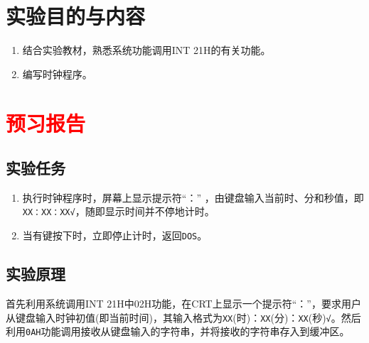 \documentclass[11pt]{SEU-Digital-Report}
\begin{document}
\exptitlepage

\tableofcontents
\newpage

\section{实验目的与内容}       
\begin{enumerate}
    \item 结合实验教材\cite{book,guide}，熟悉系统功能调用INT 21H的有关功能。
    \item 编写时钟程序。
\end{enumerate}

\section{\textcolor{red}{预习报告}}
\subsection{实验任务}       
\begin{enumerate}
    \item 执行时钟程序时，屏幕上显示提示符“：” ，由键盘输入当前时、分和秒值，即\texttt{XX：XX：XX√}，随即显示时间并不停地计时。
    \item 当有键按下时，立即停止计时，返回\texttt{DOS}。
\end{enumerate}

\subsection{实验原理}
首先利用系统调用INT 21H中02H功能，在CRT上显示一个提示符“：”，要求用户从键盘输入时钟初值(即当前时间)，其输入格式为\texttt{XX}(时)：\texttt{XX}(分)：\texttt{XX}(秒)\texttt{√}。然后利用\texttt{0AH}功能调用接收从键盘输入的字符串，并将接收的字符串存入到缓冲区。
\end{document}
